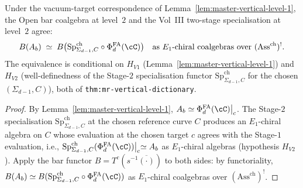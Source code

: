 \begin{lemma}
\label{lem:master-vertical-level-2}
Under the vacuum-target correspondence of
Lemma~\ref{lem:master-vertical-level-1}, the Open bar coalgebra at
level~$2$ and the Vol~III two-stage specialisation at level~$2$
agree:
\[
B(A_b)
\;\simeq\;
B\bigl(\mathrm{Sp}^{\mathrm{ch}}_{\Sigma_{d-1}, C}
       \circ \Phi_d^{\mathrm{FA}}(\cC)\bigr)
\quad\text{as }E_1\text{-chiral coalgebras over }(\mathrm{Ass}^{\mathrm{ch}})^!.
\]
The equivalence is conditional on $H_{V1}$
\textup{(}Lemma~\ref{lem:master-vertical-level-1}\textup{)} and
$H_{V2}$ \textup{(}well-definedness of the Stage-$2$ specialisation
functor $\mathrm{Sp}^{\mathrm{ch}}_{\Sigma_{d-1}, C}$ for the chosen
$(\Sigma_{d-1}, C)$\textup{)}, both of
\texttt{thm:mr-vertical-dictionary}.
\end{lemma}

\begin{proof}
By Lemma~\ref{lem:master-vertical-level-1},
$A_b \simeq \Phi_d^{\mathrm{FA}}(\cC)\bigl|_c$. The Stage-$2$
specialisation $\mathrm{Sp}^{\mathrm{ch}}_{\Sigma_{d-1}, C}$ at the
chosen reference curve $C$ produces an $E_1$-chiral algebra on $C$
whose evaluation at the chosen target $c$ agrees with the Stage-$1$
evaluation, i.e.,
$\mathrm{Sp}^{\mathrm{ch}}_{\Sigma_{d-1}, C}(\Phi_d^{\mathrm{FA}}(\cC))\bigl|_c
\simeq A_b$ as $E_1$-chiral algebras
\textup{(}hypothesis $H_{V2}$\textup{).} Apply the bar functor
$B = T^c(s^{-1} \overline{(\cdot)})$ to both sides: by functoriality,
$B(A_b) \simeq B(\mathrm{Sp}^{\mathrm{ch}}_{\Sigma_{d-1}, C}
\circ \Phi_d^{\mathrm{FA}}(\cC))$ as $E_1$-chiral coalgebras over
$(\mathrm{Ass}^{\mathrm{ch}})^!$.
\end{proof}

